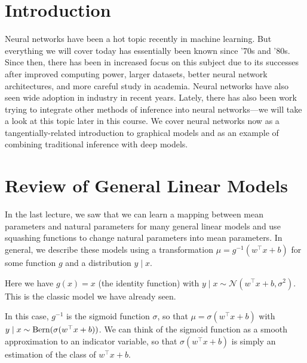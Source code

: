 \documentclass{article}
\begin{document}

\section{Introduction}

Neural networks have been a hot topic recently in machine learning. But everything we will cover today has essentially been known since '70s and '80s. Since then, there has been in increased focus on this subject due to its successes after improved computing power, larger datasets, better neural network architectures, and more careful study in academia. Neural networks have also seen wide adoption in industry in recent years. Lately, there has also been work trying to integrate other methods of inference into neural networks---we will take a look at this topic later in this course.  We cover neural networks now as a tangentially-related introduction to graphical models and as an example of combining traditional inference with deep models.

\section{Review of General Linear Models}

In the last lecture, we saw that we can learn a mapping between mean parameters and natural parameters for many general linear models and use squashing functions to change natural parameters into mean parameters.  In general, we describe these models using a transformation $\mu = g^{-1}(w^\top x+b)$ for some function $g$ and a distribution $y \mid x$.

\begin{example}
    Here we have $g(x) = x$ (the identity function) with $y \mid x \sim \mathcal{N}(w^\top x+b, \sigma^2)$.  This is the classic model we have already seen.
\end{example}

\begin{example}
    In this case, $g^{-1}$ is the sigmoid function $\sigma$, so that $\mu = \sigma(w^\top x+b)$ with $y \mid x \sim\operatorname{Bern}(\sigma(w^\top x+b))$.  We can think of the sigmoid function as a smooth approximation to an indicator variable, so that $\sigma(w^\top x+b)$ is simply an estimation of the class of $w^\top x+b$.
\end{example}
\end{document}
